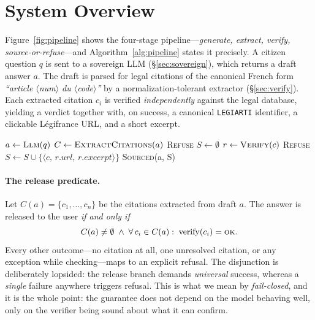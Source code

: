 \section{System Overview}
\label{sec:overview}

Figure~\ref{fig:pipeline} shows the four-stage pipeline---\emph{generate,
extract, verify, source-or-refuse}---and Algorithm~\ref{alg:pipeline} states it
precisely. A citizen question $q$ is sent to a sovereign LLM
(\S\ref{sec:sovereign}), which returns a draft answer $a$. The draft is parsed
for legal citations of the canonical French form \emph{``article
$\langle$num$\rangle$ du $\langle$code$\rangle$''} by a normalization-tolerant
extractor (\S\ref{sec:verify}). Each extracted citation $c_i$ is verified
\emph{independently} against the legal database, yielding a verdict together
with, on success, a canonical \texttt{LEGIARTI} identifier, a clickable
Légifrance URL, and a short excerpt.

\begin{algorithm}[t]
\caption{Fail-closed answering. A single unverifiable citation---or any
exception raised while checking---yields a refusal.}
\label{alg:pipeline}
\begin{algorithmic}[1]
  \State $a \gets \textsc{Llm}(q)$ 
  \State $C \gets \textsc{ExtractCitations}(a)$
    \State \Return \textsc{Refuse}
  \EndIf
  \State $S \gets \emptyset$
    \State $r \gets \textsc{Verify}(c)$ 
      \State \Return \textsc{Refuse} 
    \EndIf
    \State $S \gets S \cup \{\langle c,\, r.\mathit{url},\, r.\mathit{excerpt}\rangle\}$
  \EndFor
  \State \Return \textsc{Sourced}(a, S)
\EndFunction
\end{algorithmic}
\end{algorithm}

\paragraph{The release predicate.}
Let $C(a) = \{c_1, \dots, c_n\}$ be the citations extracted from draft $a$. The
answer is released to the user \emph{if and only if}
\[
  C(a) \neq \emptyset \;\wedge\; \forall\, c_i \in C(a):\;
  \mathrm{verify}(c_i) = \textsc{ok}.
\]
Every other outcome---no citation at all, one unresolved citation, or any
exception while checking---maps to an explicit refusal. The disjunction is
deliberately lopsided: the release branch demands \emph{universal} success,
whereas a \emph{single} failure anywhere triggers refusal. This is what we mean
by \emph{fail-closed}, and it is the whole point: the guarantee does not depend
on the model behaving well, only on the verifier being sound about what it can
confirm.

